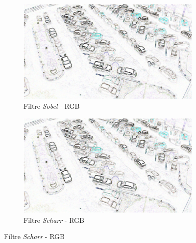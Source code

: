 \begin{appendix}
\begin{figure}[H]
    \begin{subfigure}{.5\textwidth}
        \centering
        \includegraphics[width=.85\linewidth]{img/conception/image_process/downsample-edge/0.png}
        \caption{Filtre \textit{Sobel} - RGB}
    \end{subfigure}%
    \begin{subfigure}{.5\textwidth}
        \centering
        \includegraphics[width=.85\linewidth]{img/conception/image_process/downsample-edge/3.png}
        \caption{Filtre \textit{Scharr} - RGB}
    \end{subfigure}%


\end{figure}
\end{appendix}
